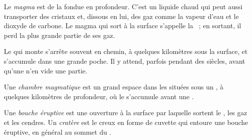 \begin{definition}[Magma]\label{def:g7:volcanoes:magma}
Le \emph{magma} est de la  fondue en profondeur. C'est un
liquide chaud qui peut aussi transporter des cristaux et, dissous en lui,
des gaz comme la vapeur d'eau et le dioxyde de carbone. Le magma qui sort à
la surface s'appelle la ~; en sortant, il perd la plus grande partie de
ses gaz.
\end{definition}

Le  qui monte s'arrête souvent en chemin, à quelques kilomètres sous
la surface, et s'accumule dans une grande poche. Il y attend, parfois
pendant des siècles, avant qu'une  n'en vide une partie.

\begin{definition}\label{def:g7:volcanoes:magma-chamber}
Une \emph{chambre magmatique} est un grand espace
dans les  situées sous un , à quelques kilomètres de
profondeur, où le  s'accumule avant une .
\end{definition}

\begin{definition}\label{def:g7:volcanoes:vent}
Une \emph{bouche éruptive} est une
ouverture à la surface par laquelle sortent le , les gaz et les
cendres. Un \emph{cratère} est le creux en forme de
cuvette qui entoure une bouche éruptive, en général au sommet du .
\end{definition}

